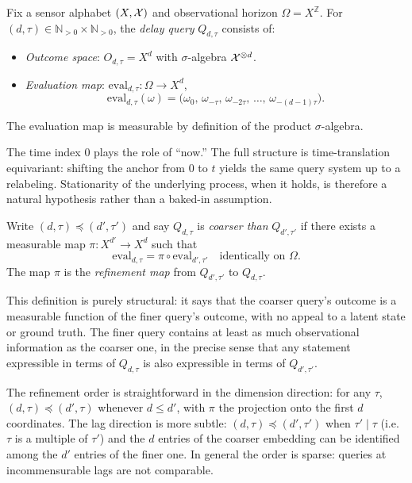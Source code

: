 \begin{definition}\label{def:delay-query}
Fix a sensor alphabet $(X, \mathcal{X})$ and observational horizon
$\Omega = X^{\mathbb{Z}}$.  For $(d, \tau) \in \mathbb{N}_{>0} \times \mathbb{N}_{>0}$,
the \emph{delay query} $Q_{d,\tau}$ consists of:
\begin{itemize}
  \item \emph{Outcome space}: $O_{d,\tau} = X^d$ with $\sigma$-algebra $\mathcal{X}^{\otimes d}$.
  \item \emph{Evaluation map}: $\mathrm{eval}_{d,\tau} : \Omega \to X^d$,
    \[
      \mathrm{eval}_{d,\tau}(\omega)
      = \bigl(\omega_0,\, \omega_{-\tau},\, \omega_{-2\tau},\, \ldots,\,
        \omega_{-(d-1)\tau}\bigr).
    \]
\end{itemize}
The evaluation map is measurable by definition of the product $\sigma$-algebra.
\end{definition}

\begin{remark}
The time index $0$ plays the role of ``now.''  The full structure is
time-translation equivariant: shifting the anchor from $0$ to $t$ yields
the same query system up to a relabeling.  Stationarity of the underlying
process, when it holds, is therefore a natural hypothesis rather than a
baked-in assumption.
\end{remark}

\begin{definition}\label{def:refinement}
Write $(d, \tau) \preceq (d', \tau')$ and say $Q_{d,\tau}$ is
\emph{coarser than} $Q_{d',\tau'}$ if there exists a measurable map
$\pi : X^{d'} \to X^d$ such that
\[
  \mathrm{eval}_{d,\tau} = \pi \circ \mathrm{eval}_{d',\tau'}
  \quad \text{identically on } \Omega.
\]
The map $\pi$ is the \emph{refinement map} from $Q_{d',\tau'}$ to $Q_{d,\tau}$.
\end{definition}

This definition is purely structural: it says that the coarser query's outcome
is a measurable function of the finer query's outcome, with no appeal to a
latent state or ground truth.  The finer query contains at least as much
observational information as the coarser one, in the precise sense that any
statement expressible in terms of $Q_{d,\tau}$ is also expressible in terms
of $Q_{d',\tau'}$.

\begin{remark}
The refinement order is straightforward in the dimension direction: for any
$\tau$, $(d, \tau) \preceq (d', \tau)$ whenever $d \leq d'$, with $\pi$ the
projection onto the first $d$ coordinates.  The lag direction is more subtle:
$(d, \tau) \preceq (d', \tau')$ when $\tau' \mid \tau$ (i.e.\ $\tau$ is a
multiple of $\tau'$) and the $d$ entries of the coarser embedding can be
identified among the $d'$ entries of the finer one.  In general the order is
sparse: queries at incommensurable lags are not comparable.
\end{remark}

